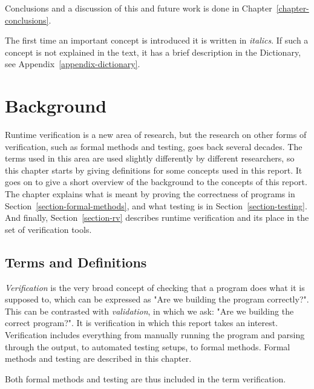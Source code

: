 \documentclass[a4paper,11pt]{kth-mag}
\begin{document}
Conclusions and a discussion of this and future work is done in
Chapter~\ref{chapter-conclusions}.

The first time an important concept is introduced it is written in
\textit{italics}. If such a concept is not explained in the text, it has a
brief description in the Dictionary, see Appendix~\ref{appendix-dictionary}.






\pagestyle{newchap}
\chapter{Background} \label{chapter-background}

Runtime verification is a new area of research, but the research on other forms
of verification, such as formal methods and testing, goes back several decades.
The terms used in this area are used slightly differently by different
researchers, so this chapter starts by giving definitions for some concepts
used in this report. It goes on to give a short overview of the background to
the concepts of this report. The chapter explains what is meant by proving the
correctness of programs in Section~\ref{section-formal-methods}, and what
testing is in Section~\ref{section-testing}. And finally,
Section~\ref{section-rv} describes runtime verification and its place in the
set of verification tools.


\section{Terms and Definitions}
\label{section-background-definitions}
\label{section-definition-verification}
\label{section-system-model}

\textit{Verification} is the very broad concept of checking that a program does
what it is supposed to, which can be expressed as "Are we building the program
correctly?". This can be contrasted with \textit{validation}, in which we ask:
"Are we building the correct program?". It is verification in which this report
takes an interest. Verification includes everything from manually running the
program and parsing through the output, to automated testing setups, to formal
methods. Formal methods and testing are described in this chapter.

Both formal methods and testing are thus included in the term verification.
\end{document}
